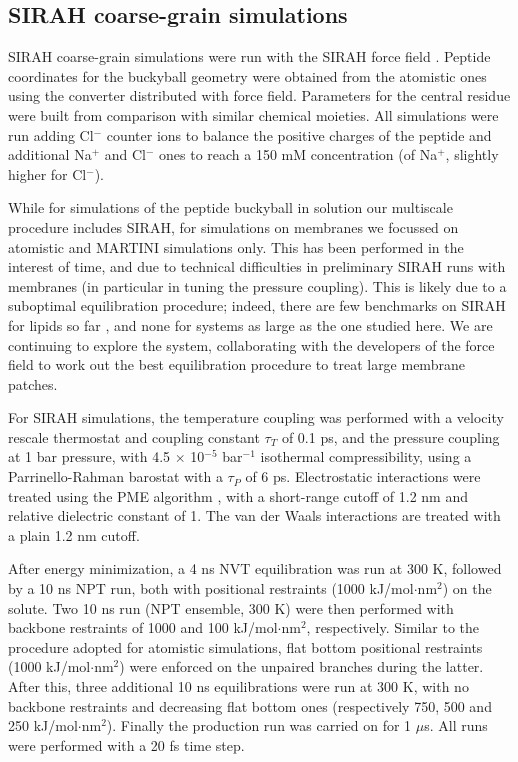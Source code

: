 \subsection{SIRAH coarse-grain simulations}
SIRAH coarse-grain simulations were run with the SIRAH force field \citep{Machado2018}. Peptide coordinates for the buckyball geometry were obtained from the atomistic ones using the converter distributed with force field. Parameters for the central residue were built from comparison with similar chemical moieties. All simulations were run adding Cl$^-$ counter ions to balance the positive charges of the peptide and additional Na$^+$  and Cl$^-$ ones to reach a 150 mM concentration (of Na$^+$, slightly higher for Cl$^-$).

While for simulations of the peptide buckyball in solution our multiscale procedure includes SIRAH, for simulations on membranes we focussed on atomistic and MARTINI simulations only. This has been performed in the interest of time, and due to technical difficulties in preliminary SIRAH runs with membranes (in particular in tuning the pressure coupling).
%
This is likely due to a suboptimal equilibration procedure; indeed, there are few benchmarks on SIRAH for lipids so far \citep{Barrera2019}, and none for systems as large as the one studied here. We are continuing to explore the system, collaborating with the developers of the force field to work out the best equilibration procedure to treat large membrane patches.

For SIRAH simulations, the temperature coupling was performed with a velocity rescale thermostat \citep{Bussi2007} and coupling constant $\tau _T$ of 0.1 ps, and the pressure coupling at 1 bar pressure, with 4.5 $\times$ 10$^{-5}$ bar$^{-1}$ isothermal compressibility, using a Parrinello-Rahman barostat \citep{Parrinello1981} with a $\tau _P$ of 6 ps. Electrostatic interactions were treated using the PME algorithm \citep{Essmann1995}, with a short-range cutoff of 1.2 nm and relative dielectric constant of 1. The van der Waals interactions are treated with a plain 1.2 nm cutoff.

After energy minimization, a 4 ns NVT equilibration was run at 300 K, followed by a 10 ns NPT run, both with positional restraints (1000 kJ/mol$\cdot$nm$^2$) on the solute. Two 10 ns run (NPT ensemble, 300 K) were then performed with backbone restraints of 1000 and 100 kJ/mol$\cdot$nm$^2$, respectively. Similar to the procedure adopted for atomistic simulations, flat bottom positional restraints (1000 kJ/mol$\cdot$nm$^2$) were enforced on the unpaired branches during the latter. After this, three additional 10 ns equilibrations were run at 300 K, with no backbone restraints and decreasing flat bottom ones (respectively 750, 500 and 250 kJ/mol$\cdot$nm$^2$). Finally the production run was carried on for 1 $\mu$s. All runs were performed with a 20 fs time step.

